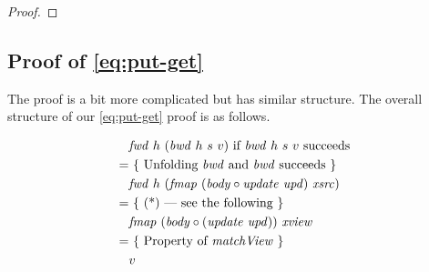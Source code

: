 \documentclass{article}
\theoremstyle{definition}
\newcommand{\texteq}{\mathrel{\texttt{==}}}
\begin{document}
\begin{proof}
\end{proof}

\subsection{Proof of \ref{eq:put-get}}

The proof is a bit more complicated but has similar structure.
The overall structure of our \ref{eq:put-get} proof is as follows. 

\begin{align*}
  & \mathit{fwd}~h~(\mathit{bwd}~h~s~v) \mbox{ if $\mathit{bwd}~h~s~v$ succeeds } \\
= & ~\{ \mbox{ Unfolding $\mathit{bwd}$ and $\mathit{bwd}$ succeeds } \}\\
  & \mathit{fwd}~h~(\mathit{fmap}~(\mathit{body} \circ \mathit{update}~\mathit{upd})~\mathit{xsrc})\\
= & ~\{ \mbox{ (*) --- see the following } \}\\
  & \mathit{fmap}~(\mathit{body} \circ (\mathit{update}~\mathit{upd}))~\mathit{xview}\\
= & ~\{ \mbox{ Property of $\mathit{matchView}$ } \} \\
  & v 
\end{align*}
\end{document}
